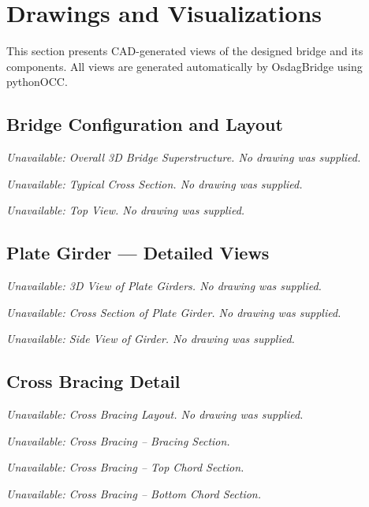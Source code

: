 \documentclass[12pt,a4paper]{report}
\numberwithin{table}{chapter}
\numberwithin{figure}{chapter}
\begin{document}
\setcounter{chapter}{5}
\chapter{Drawings and Visualizations}
\label{ch:drawings}

This section presents CAD-generated views of the designed bridge and its components. All views are generated automatically by OsdagBridge using pythonOCC.

\section{Bridge Configuration and Layout}
\label{sec:bridge-layout}

\noindent\textit{Unavailable: Overall 3D Bridge Superstructure. No drawing was supplied.}\par


\noindent\textit{Unavailable: Typical Cross Section. No drawing was supplied.}\par


\noindent\textit{Unavailable: Top View. No drawing was supplied.}\par


\section{Plate Girder --- Detailed Views}
\label{sec:girder-views}

\noindent\textit{Unavailable: 3D View of Plate Girders. No drawing was supplied.}\par


\noindent\textit{Unavailable: Cross Section of Plate Girder. No drawing was supplied.}\par


\noindent\textit{Unavailable: Side View of Girder. No drawing was supplied.}\par


\section{Cross Bracing Detail}
\label{sec:bracing-detail}

\noindent\textit{Unavailable: Cross Bracing Layout. No drawing was supplied.}\par


\noindent
\begin{minipage}[t]{0.31\textwidth}\textit{Unavailable: Cross Bracing -- Bracing Section.}\end{minipage}
\hfill
\begin{minipage}[t]{0.31\textwidth}\textit{Unavailable: Cross Bracing -- Top Chord Section.}\end{minipage}
\hfill
\begin{minipage}[t]{0.31\textwidth}\textit{Unavailable: Cross Bracing -- Bottom Chord Section.}\end{minipage}
            
\end{document}
